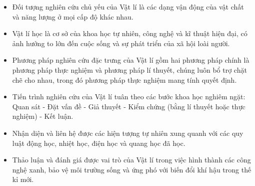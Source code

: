 \begin{emdahoc}
\begin{itemize}
\item Đối tượng nghiên cứu chủ yếu của Vật lí là các dạng vận động của vật chất và năng lượng ở mọi cấp độ khác nhau.
\item Vật lí học là cơ sở của khoa học tự nhiên, công nghệ và kĩ thuật hiện đại, có ảnh hưởng to lớn đến cuộc sống và sự phát triển của xã hội loài người.
\item Phương pháp nghiên cứu đặc trưng của Vật lí gồm hai phương pháp chính là phương pháp thực nghiệm và phương pháp lí thuyết, chúng luôn bổ trợ chặt chẽ cho nhau, trong đó phương pháp thực nghiệm mang tính quyết định.
\item Tiến trình nghiên cứu của Vật lí tuân theo các bước khoa học nghiêm ngặt: Quan sát - Đặt vấn đề - Giả thuyết - Kiểm chứng (bằng lí thuyết hoặc thực nghiệm) - Kết luận.
\end{itemize}
\end{emdahoc}
\begin{emcothe}
\begin{itemize}
\item Nhận diện và liên hệ được các hiện tượng tự nhiên xung quanh với các quy luật động học, nhiệt học, điện học và quang học đã học.
\item Thảo luận và đánh giá được vai trò của Vật lí trong việc hình thành các công nghệ xanh, bảo vệ môi trường sống và ứng phó với biến đổi khí hậu trong thế kỉ mới.
\end{itemize}
\end{emcothe}